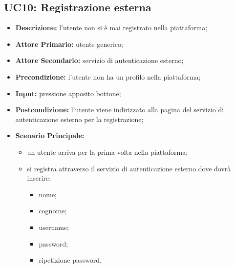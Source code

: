 \subsection{UC10: Registrazione esterna}
\label{sec:UC10}
\begin{itemize}
    \item \textbf{Descrizione:} l'utente non si è mai registrato nella piattaforma;
    \item \textbf{Attore Primario:} utente generico;
    \item \textbf{Attore Secondario:} servizio di autenticazione esterno;
    \item \textbf{Precondizione:} l'utente non ha un profilo nella piattaforma;
    \item \textbf{Input:} pressione apposito bottone;
    \item \textbf{Postcondizione:} l'utente viene indirizzato alla pagina del servizio di autenticazione esterno per la registrazione;
    \item \textbf{Scenario Principale:}
          \begin{itemize}
              \item un utente arriva per la prima volta nella piattaforma;
              \item si registra attraverso il servizio di autenticazione esterno dove dovrà inserire:
                    \begin{itemize}
                        \item nome;
                        \item cognome;
                        \item username;
                        \item password;
                        \item ripetizione password.
                    \end{itemize}
          \end{itemize}
\end{itemize}